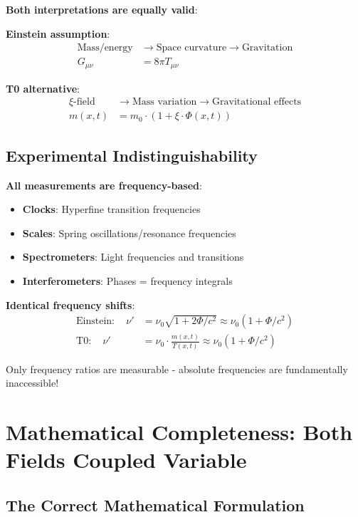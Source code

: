 \documentclass[12pt,a4paper]{article}
\newcommand{\xipar}{\xi}
\theoremstyle{definition}
\theoremstyle{remark}
\begin{document}
	\textbf{Both interpretations are equally valid}:
	
	\textbf{Einstein assumption}:
	\begin{align}
		\text{Mass/energy} &\rightarrow \text{Space curvature} \rightarrow \text{Gravitation} \\
		G_{\mu\nu} &= 8\pi T_{\mu\nu}
	\end{align}
	
	\textbf{T0 alternative}:
	\begin{align}
		\xipar\text{-field} &\rightarrow \text{Mass variation} \rightarrow \text{Gravitational effects} \\
		m(x,t) &= m_0 \cdot (1 + \xipar \cdot \Phi(x,t))
	\end{align}
	
	\subsection{Experimental Indistinguishability}
	
	\textbf{All measurements are frequency-based}:
	\begin{itemize}
		\item \textbf{Clocks}: Hyperfine transition frequencies
		\item \textbf{Scales}: Spring oscillations/resonance frequencies
		\item \textbf{Spectrometers}: Light frequencies and transitions
		\item \textbf{Interferometers}: Phases = frequency integrals
	\end{itemize}
	
	\textbf{Identical frequency shifts}:
	\begin{align}
		\text{Einstein}: \quad \nu' &= \nu_0 \sqrt{1 + 2\Phi/c^2} \approx \nu_0 (1 + \Phi/c^2) \\
		\text{T0}: \quad \nu' &= \nu_0 \cdot \frac{m(x,t)}{T(x,t)} \approx \nu_0 (1 + \Phi/c^2)
	\end{align}
	
	Only frequency ratios are measurable - absolute frequencies are fundamentally inaccessible!
	
	\section{Mathematical Completeness: Both Fields Coupled Variable}
	
	\subsection{The Correct Mathematical Formulation}
	
\end{document}
